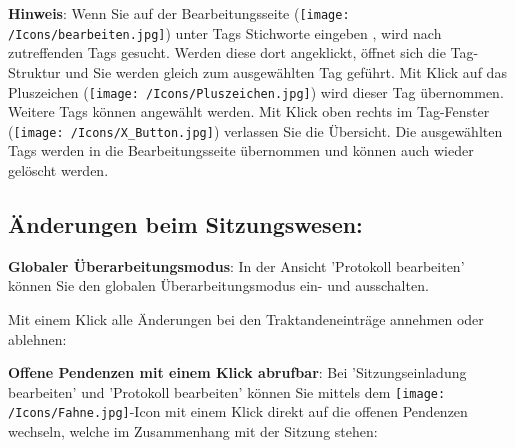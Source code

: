 \vspace{\baselineskip}

\textbf{Hinweis}: Wenn Sie auf der Bearbeitungsseite (\texttt{[image: /Icons/bearbeiten.jpg]}) unter Tags Stichworte eingeben , wird nach zutreffenden Tags gesucht. Werden diese dort angeklickt, öffnet sich die Tag-Struktur und Sie werden gleich zum ausgewählten Tag geführt. Mit Klick auf das Pluszeichen (\texttt{[image: /Icons/Pluszeichen.jpg]}) wird dieser Tag übernommen. Weitere Tags können angewählt werden. Mit Klick oben rechts im Tag-Fenster (\texttt{[image: /Icons/X\_Button.jpg]}) verlassen Sie die Übersicht. Die ausgewählten Tags werden in die Bearbeitungsseite übernommen und können auch wieder gelöscht werden.

\pagebreak
\subsection{Änderungen beim Sitzungswesen:} %

\textbf{Globaler Überarbeitungsmodus}:
In der Ansicht 'Protokoll bearbeiten' können Sie den globalen Überarbeitungsmodus ein- und ausschalten. 

\begin{figure}[H]
\end{figure}

Mit einem Klick alle Änderungen bei den Traktandeneinträge annehmen oder ablehnen:

\begin{figure}[H]
\end{figure}

\textbf{Offene Pendenzen mit einem Klick abrufbar}:
Bei 'Sitzungseinladung bearbeiten' und 'Protokoll bearbeiten' können Sie mittels dem \texttt{[image: /Icons/Fahne.jpg]}-Icon mit einem Klick direkt auf die offenen Pendenzen wechseln, welche im Zusammenhang mit der Sitzung stehen:

